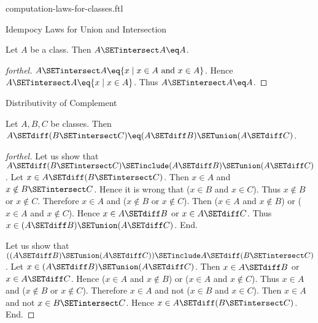 \documentclass{naproche-library}
\begin{document}
\begin{smodule}[title=Computation Laws For Classes]{computation-laws-for-classes.ftl}
\begin{sfragment}{Idempocy Laws for Union and Intersection}
  \begin{proposition}[forthel,id=FOUNDATIONS_02_4053144145231872]
    Let $A$ be a class.
    Then $A \SETintersect A \eq A$.
  \end{proposition}
  \begin{proof}[forthel]
    $A \SETintersect A \eq \{ x \mid x \in A\text{ and }x \in A \}$.
    Hence $A \SETintersect A \eq \{ x \mid x \in A \}$.
    Thus $A \SETintersect A \eq A$.
  \end{proof}
\end{sfragment}

\begin{sfragment}{Distributivity of Complement}
  \begin{proposition}[forthel,id=FOUNDATIONS_02_5296031436636160]
    Let $A, B, C$ be classes.
    Then $A \SETdiff (B \SETintersect C) \eq (A \SETdiff B) \SETunion (A \SETdiff C)$.
  \end{proposition}
  \begin{proof}[forthel]
    Let us show that $A \SETdiff (B \SETintersect C) \SETinclude (A \SETdiff B) \SETunion (A \SETdiff C)$.
      Let $x \in A \SETdiff (B \SETintersect C)$.
      Then $x \in A$ and $x \notin B \SETintersect C$.
      Hence it is wrong that ($x \in B$ and $x \in C$).
      Thus $x \notin B$ or $x \notin C$.
      Therefore $x \in A$ and ($x \notin B$ or $x \notin C$).
      Then ($x \in A$ and $x \notin B$) or ($x \in A$ and $x \notin C$).
      Hence $x \in A \SETdiff B$ or $x \in A \SETdiff C$.
      Thus $x \in (A \SETdiff B) \SETunion (A \SETdiff C)$.
    End.

    Let us show that $((A \SETdiff B) \SETunion (A \SETdiff C)) \SETinclude A \SETdiff (B \SETintersect C)$. %
      Let $x \in (A \SETdiff B) \SETunion (A \SETdiff C)$.
      Then $x \in A \SETdiff B$ or $x \in A \SETdiff C$.
      Hence ($x \in A$ and $x \notin B$) or ($x \in A$ and $x \notin C$).
      Thus $x \in A$ and ($x \notin B$ or $x \notin C$).
      Therefore $x \in A$ and not ($x \in B$ and $x \in C$).
      Then $x \in A$ and not $x \in B \SETintersect C$.
      Hence $x \in A \SETdiff (B \SETintersect C)$.
    End.
  \end{proof}


\end{sfragment}
\end{smodule}
\end{document}
